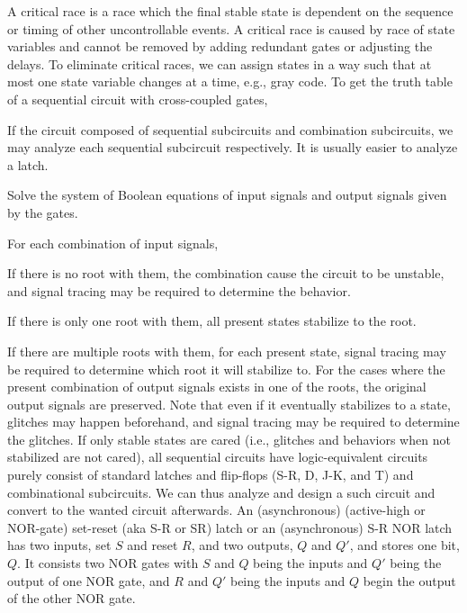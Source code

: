 \documentclass[a4paper,12pt]{report}
\begin{document}
A critical race is a race which the final stable state is dependent on the sequence or timing of other uncontrollable events. A critical race is caused by race of state variables and cannot be removed by adding redundant gates or adjusting the delays. To eliminate critical races, we can assign states in a way such that at most one state variable changes at a time, e.g., gray code.
To get the truth table of a sequential circuit with cross-coupled gates,
\ben
\item If the circuit composed of sequential subcircuits and combination subcircuits, we may analyze each sequential subcircuit respectively. It is usually easier to analyze a latch.
\item Solve the system of Boolean equations of input signals and output signals given by the gates.
\item For each combination of input signals,
\bit
\item If there is no root with them, the combination cause the circuit to be unstable, and signal tracing may be required to determine the behavior.
\item If there is only one root with them, all present states stabilize to the root.
\item If there are multiple roots with them, for each present state, signal tracing may be required to determine which root it will stabilize to. For the cases where the present combination of output signals exists in one of the roots, the original output signals are preserved.
\eit
\een
Note that even if it eventually stabilizes to a state, glitches may happen beforehand, and signal tracing may be required to determine the glitches.
If only stable states are cared (i.e., glitches and behaviors when not stabilized are not cared), all sequential circuits have logic-equivalent circuits purely consist of standard latches and flip-flops (S-R, D, J-K, and T) and combinational subcircuits. We can thus analyze and design a such circuit and convert to the wanted circuit afterwards.
An (asynchronous) (active-high or NOR-gate) set-reset (aka S-R or SR) latch or an (asynchronous) S-R NOR latch has two inputs, set $S$ and reset $R$, and two outputs, $Q$ and $Q'$, and stores one bit, $Q$. It consists two NOR gates with $S$ and $Q$ being the inputs and $Q'$ being the output of one NOR gate, and $R$ and $Q'$ being the inputs and $Q$ begin the output of the other NOR gate.
\end{document}
